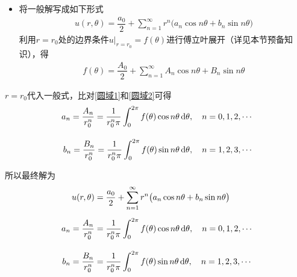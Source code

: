 \begin{enumerate}[\textbf{步骤}1 ]
\begin{itemize}
		\item 将一般解写成如下形式
		\begin{align}
			u(r, \theta) =  \dfrac{a_0}{2} + \sum_{n = 1}^\infty  r^n \big(a_n \cos n\theta  + b_n \sin n \theta \big)
			\label{圆域1}
		\end{align}
		利用$r = r_0$处的边界条件$u|_{r = r_0} = f(\theta)$进行傅立叶展开（详见本节预备知识），得
		\begin{align}
			f(\theta) = \dfrac{A_0}{2} + \sum_{n=1}^{\infty} A_n\cos n \theta + B_n\sin n \theta 
			\label{圆域2}
		\end{align}
	\end{itemize}
	$r =r_0$代入一般式，比对\eqref{圆域1}和\eqref{圆域2}可得
	\begin{align}
		a_n = \dfrac{A_n}{r_0^n} = \dfrac{1}{r_0^n \pi} \int_{0}^{2 \pi} f(\theta) \cos n\theta \, {\rm{d}} \theta , \quad n =0,1,2, \cdots\\[1em]
		b_n = \dfrac{B_n}{r_0^n} = \dfrac{1}{r_0^n \pi} \int_{0}^{2 \pi} f(\theta) \sin n\theta \, {\rm{d}} \theta , \quad n =1,2,3, \cdots
	\end{align}
\end{enumerate}
所以最终解为
\begin{align}
	u(r, \theta) &=  \dfrac{a_0}{2} + \sum_{n = 1}^\infty  r^n \big(a_n \cos n\theta  + b_n \sin n \theta \big)\\[0.5em]
	a_n = \dfrac{A_n}{r_0^n} &= \dfrac{1}{r_0^n \pi} \int_{0}^{2 \pi} f(\theta) \cos n\theta \, {\rm{d}} \theta , \quad n =0,1,2, \cdots\notag\\[1em]
	b_n = \dfrac{B_n}{r_0^n} &= \dfrac{1}{r_0^n \pi} \int_{0}^{2 \pi} f(\theta) \sin n\theta \, {\rm{d}} \theta , \quad n =1,2,3, \cdots \notag
\end{align}

\vspace*{-2.5em}

